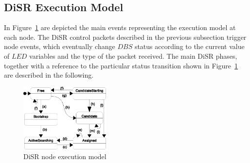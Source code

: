 \subsection{DiSR Execution Model}

In Figure~\ref{fig:state_machine} are depicted the main events
representing the execution model at each node. The DiSR control
packets described in the previous subsection trigger node events,
which eventually change $DBS$ status according to the current value of
$LED$ variables and the type of the packet received. The main DiSR
phases, together with a reference to the particular status transition
shown in Figure~\ref{fig:state_machine} are described in the
following.

\begin{figure}
  \centering
    \includegraphics[width=0.40\textwidth]{pictures/state_machine.eps}
  \caption{DiSR node execution model}
  \label{fig:state_machine}
\end{figure}

